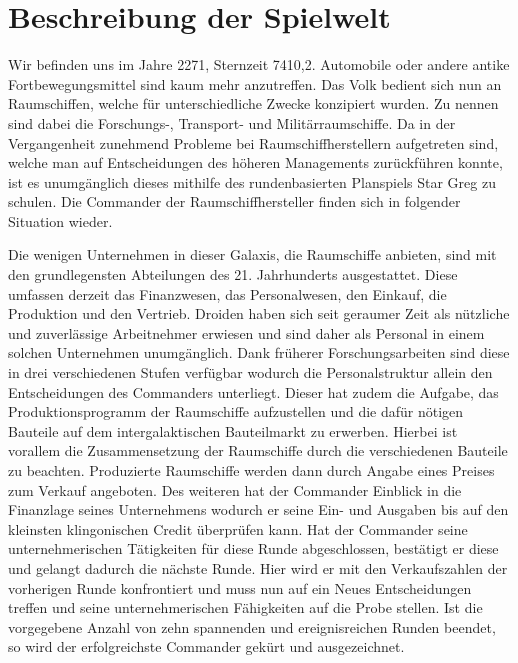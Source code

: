 \section{Beschreibung der Spielwelt}
\label{sec:spielwelt-szenario-spielwelt}

Wir befinden uns im Jahre 2271, Sternzeit 7410,2. Automobile oder andere antike Fortbewegungsmittel sind kaum mehr anzutreffen. Das Volk bedient sich nun an Raumschiffen, welche für unterschiedliche Zwecke konzipiert wurden. Zu nennen sind dabei die Forschungs-, Transport- und Militärraumschiffe. Da in der Vergangenheit zunehmend Probleme bei Raumschiffherstellern aufgetreten sind, welche man auf Entscheidungen des höheren Managements zurückführen konnte, ist es unumgänglich dieses mithilfe des rundenbasierten Planspiels Star Greg zu schulen. Die Commander der Raumschiffhersteller finden sich in folgender Situation wieder.

Die wenigen Unternehmen in dieser Galaxis, die Raumschiffe anbieten, sind mit den grundlegensten Abteilungen des 21. Jahrhunderts ausgestattet. Diese umfassen derzeit das Finanzwesen, das Personalwesen, den Einkauf, die Produktion und den Vertrieb. Droiden haben sich seit geraumer Zeit als nützliche und zuverlässige Arbeitnehmer erwiesen und sind daher als Personal in einem solchen Unternehmen unumgänglich. Dank früherer Forschungsarbeiten sind diese in drei verschiedenen Stufen verfügbar wodurch die Personalstruktur allein den Entscheidungen des Commanders unterliegt. Dieser hat zudem die Aufgabe, das Produktionsprogramm der Raumschiffe aufzustellen und die dafür nötigen Bauteile auf dem intergalaktischen Bauteilmarkt zu erwerben. Hierbei ist vorallem die Zusammensetzung der Raumschiffe durch die verschiedenen Bauteile zu beachten. Produzierte Raumschiffe werden dann durch Angabe eines Preises zum Verkauf angeboten. Des weiteren hat der Commander Einblick in die Finanzlage seines Unternehmens wodurch er seine Ein- und Ausgaben bis auf den kleinsten klingonischen Credit überprüfen kann. Hat der Commander seine unternehmerischen Tätigkeiten für diese Runde abgeschlossen, bestätigt er diese und gelangt dadurch die nächste Runde. Hier wird er mit den Verkaufszahlen der vorherigen Runde konfrontiert und muss nun auf ein Neues Entscheidungen treffen und seine unternehmerischen Fähigkeiten auf die Probe stellen. Ist die vorgegebene Anzahl von zehn spannenden und ereignisreichen Runden beendet, so wird der erfolgreichste Commander gekürt und ausgezeichnet.
